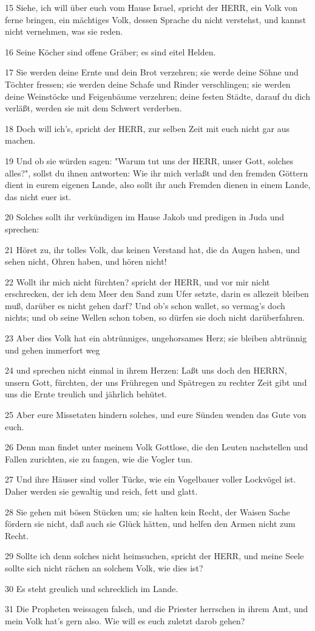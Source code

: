 \par 15 Siehe, ich will über euch vom Hause Israel, spricht der HERR, ein Volk von ferne bringen, ein mächtiges Volk, dessen Sprache du nicht verstehst, und kannst nicht vernehmen, was sie reden.
\par 16 Seine Köcher sind offene Gräber; es sind eitel Helden.
\par 17 Sie werden deine Ernte und dein Brot verzehren; sie werde deine Söhne und Töchter fressen; sie werden deine Schafe und Rinder verschlingen; sie werden deine Weinstöcke und Feigenbäume verzehren; deine festen Städte, darauf du dich verläßt, werden sie mit dem Schwert verderben.
\par 18 Doch will ich's, spricht der HERR, zur selben Zeit mit euch nicht gar aus machen.
\par 19 Und ob sie würden sagen: "Warum tut uns der HERR, unser Gott, solches alles?", sollst du ihnen antworten: Wie ihr mich verlaßt und den fremden Göttern dient in eurem eigenen Lande, also sollt ihr auch Fremden dienen in einem Lande, das nicht euer ist.
\par 20 Solches sollt ihr verkündigen im Hause Jakob und predigen in Juda und sprechen:
\par 21 Höret zu, ihr tolles Volk, das keinen Verstand hat, die da Augen haben, und sehen nicht, Ohren haben, und hören nicht!
\par 22 Wollt ihr mich nicht fürchten? spricht der HERR, und vor mir nicht erschrecken, der ich dem Meer den Sand zum Ufer setzte, darin es allezeit bleiben muß, darüber es nicht gehen darf? Und ob's schon wallet, so vermag's doch nichts; und ob seine Wellen schon toben, so dürfen sie doch nicht darüberfahren.
\par 23 Aber dies Volk hat ein abtrünniges, ungehorsames Herz; sie bleiben abtrünnig und gehen immerfort weg
\par 24 und sprechen nicht einmal in ihrem Herzen: Laßt uns doch den HERRN, unsern Gott, fürchten, der uns Frühregen und Spätregen zu rechter Zeit gibt und uns die Ernte treulich und jährlich behütet.
\par 25 Aber eure Missetaten hindern solches, und eure Sünden wenden das Gute von euch.
\par 26 Denn man findet unter meinem Volk Gottlose, die den Leuten nachstellen und Fallen zurichten, sie zu fangen, wie die Vogler tun.
\par 27 Und ihre Häuser sind voller Tücke, wie ein Vogelbauer voller Lockvögel ist. Daher werden sie gewaltig und reich, fett und glatt.
\par 28 Sie gehen mit bösen Stücken um; sie halten kein Recht, der Waisen Sache fördern sie nicht, daß auch sie Glück hätten, und helfen den Armen nicht zum Recht.
\par 29 Sollte ich denn solches nicht heimsuchen, spricht der HERR, und meine Seele sollte sich nicht rächen an solchem Volk, wie dies ist?
\par 30 Es steht greulich und schrecklich im Lande.
\par 31 Die Propheten weissagen falsch, und die Priester herrschen in ihrem Amt, und mein Volk hat's gern also. Wie will es euch zuletzt darob gehen?

